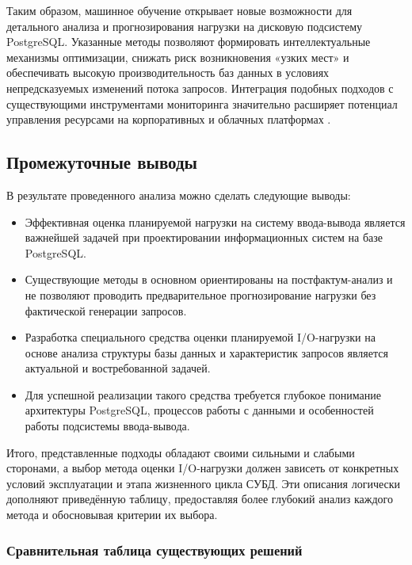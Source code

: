 Таким образом, машинное обучение открывает новые возможности для детального анализа и прогнозирования нагрузки на дисковую подсистему PostgreSQL. Указанные методы позволяют формировать интеллектуальные механизмы оптимизации, снижать риск возникновения «узких мест» и обеспечивать высокую производительность баз данных в условиях непредсказуемых изменений потока запросов. Интеграция подобных подходов с существующими инструментами мониторинга значительно расширяет потенциал управления ресурсами на корпоративных и облачных платформах \cite{zaghloul2024correction, sun2023predictive, ozkaya2020deep}.


\subsection{Промежуточные выводы}

В результате проведенного анализа можно сделать следующие выводы:

\begin{itemize}
    \item Эффективная оценка планируемой нагрузки на систему ввода-вывода является важнейшей задачей при проектировании информационных систем на базе PostgreSQL.
    \item Существующие методы в основном ориентированы на постфактум-анализ и не позволяют проводить предварительное прогнозирование нагрузки без фактической генерации запросов.
    \item Разработка специального средства оценки планируемой I/O-нагрузки на основе анализа структуры базы данных и характеристик запросов является актуальной и востребованной задачей.
    \item Для успешной реализации такого средства требуется глубокое понимание архитектуры PostgreSQL, процессов работы с данными и особенностей работы подсистемы ввода-вывода.
\end{itemize}

Итого, представленные подходы обладают своими сильными и слабыми сторонами, а выбор метода оценки I/O-нагрузки должен зависеть от конкретных условий эксплуатации и этапа жизненного цикла СУБД. Эти описания логически дополняют приведённую таблицу, предоставляя более глубокий анализ каждого метода и обосновывая критерии их выбора.


\subsubsection{Сравнительная таблица существующих решений}

